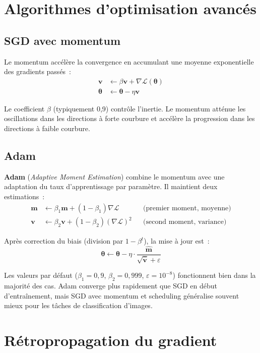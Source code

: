 \documentclass[a4paper,11pt,twoside]{book}
\newcommand{\vect}[1]{\boldsymbol{#1}}
\begin{document}
\section{Algorithmes d'optimisation avancés}

\subsection{SGD avec momentum}

Le momentum accélère la convergence en accumulant une moyenne exponentielle des gradients passés~:
\begin{align}
\vect{v} &\leftarrow \beta \vect{v} + \nabla \mathcal{L}(\vect{\theta}) \\
\vect{\theta} &\leftarrow \vect{\theta} - \eta \vect{v}
\end{align}

Le coefficient $\beta$ (typiquement 0,9) contrôle l'inertie. Le momentum atténue les oscillations dans les directions à forte courbure et accélère la progression dans les directions à faible courbure.

\subsection{Adam}

\textbf{Adam} (\textit{Adaptive Moment Estimation}) combine le momentum avec une adaptation du taux d'apprentissage par paramètre. Il maintient deux estimations~:
\begin{align}
\vect{m} &\leftarrow \beta_1 \vect{m} + (1-\beta_1)\nabla\mathcal{L} && \text{(premier moment, moyenne)}\\
\vect{v} &\leftarrow \beta_2 \vect{v} + (1-\beta_2)(\nabla\mathcal{L})^2 && \text{(second moment, variance)}
\end{align}

Après correction du biais (division par $1-\beta^t$), la mise à jour est~:
\[
\vect{\theta} \leftarrow \vect{\theta} - \eta \cdot \frac{\hat{\vect{m}}}{\sqrt{\hat{\vect{v}}} + \varepsilon}
\]

Les valeurs par défaut ($\beta_1=0{,}9$, $\beta_2=0{,}999$, $\varepsilon=10^{-8}$) fonctionnent bien dans la majorité des cas. Adam converge plus rapidement que SGD en début d'entraînement, mais SGD avec momentum et scheduling généralise souvent mieux pour les tâches de classification d'images.

\section{Rétropropagation du gradient}
\end{document}

